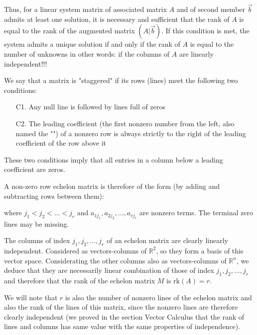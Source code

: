 	Thus, for a linear system matrix of associated matrix $A$ and of second member $\vec{b}$ admits at least one solution, it is necessary and sufficient that the rank of $A$ is equal to the rank of the augmented matrix $(A|\vec{b})$. If this condition is met, the system admits a unique solution if and only if the rank of $A$ is equal to the number of unknowns in other words: if the columns of $A$ are linearly independent!!!
	
	We say that a matrix is "staggered" if its rows (lines) meet the following two conditions:
	\begin{enumerate}
		\item[C1.] Any null line is followed by lines full of zeros
		
		\item[C2.] The leading coefficient (the first nonzero number from the left, also named the "") of a nonzero row is always strictly to the right of the leading coefficient of the row above it 
	\end{enumerate}
	These two conditions imply that all entries in a column below a leading coefficient are zeros.
	
	A non-zero row echelon matrix is therefore of the form (by adding and subtracting rows between them):
	
	where $j_1<j_2<...<j_r$ and $a_{1j_1},a_{2j_2},...,a_{rj_r}$ are nonzero terms. The terminal zero lines may be missing.
	
	The columns of index $j_1,j_2,...,j_r$ of an echelon matrix are clearly linearly independent. Considered as vectors-columns of $\mathbb{R}^2$, so they form a basis of this vector space. Considerating the other columns also as vectors-columns of $\mathbb{R}^n$, we deduce that they are necessarily linear combination of those of index  $j_1,j_2,...,j_r$ and therefore that the rank of the echelon matrix $M$ is $\text{rk}(A)=r$.
	
	We will note that $r$ is also the number of nonzero lines of the echelon matrix and also the rank of the lines of this matrix, since the nonzero lines are therefore clearly independent (we proved in the section Vector Calculus that the rank of lines and columns has same value with the same properties of independence).
	
